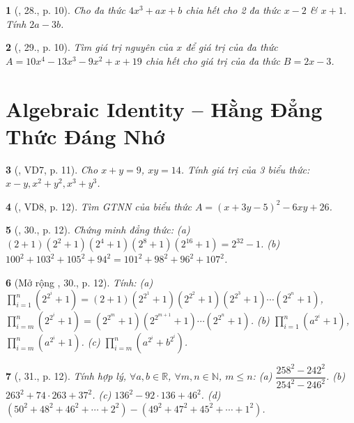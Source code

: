 \documentclass{article}
\newtheorem{baitoan}{}
\begin{document}
\begin{baitoan}[\cite{Tuyen_Toan_8}, 28., p. 10]
	Cho đa thức $4x^3 + ax + b$ chia hết cho 2 đa thức $x - 2$ \& $x + 1$. Tính $2a - 3b$.
\end{baitoan}

\begin{baitoan}[\cite{Tuyen_Toan_8}, 29., p. 10]
	Tìm giá trị nguyên của $x$ để giá trị của đa thức $A = 10x^4 - 13x^3 - 9x^2 + x + 19$ chia hết cho giá trị của đa thức $B = 2x - 3$.
\end{baitoan}


\section{Algebraic Identity -- Hằng Đẳng Thức Đáng Nhớ}

\begin{baitoan}[\cite{Tuyen_Toan_8}, VD7, p. 11]
	Cho $x + y = 9$, $xy = 14$. Tính giá trị của 3 biểu thức: $x - y,x^2 + y^2,x^3 + y^3$.
\end{baitoan}

\begin{baitoan}[\cite{Tuyen_Toan_8}, VD8, p. 12]
	Tìm {\rm GTNN} của biểu thức $A = (x + 3y - 5)^2 - 6xy + 26$.
\end{baitoan}

\begin{baitoan}[\cite{Tuyen_Toan_8}, 30., p. 12]
	Chứng minh đẳng thức: (a) $(2 + 1)(2^2 + 1)(2^4 + 1)(2^8 + 1)(2^{16} + 1) = 2^{32} - 1$. (b) $100^2 + 103^2 + 105^2 + 94^2 = 101^2 + 98^2 + 96^2 + 107^2$.
\end{baitoan}

\begin{baitoan}[Mở rộng \cite{Tuyen_Toan_8}, 30., p. 12]
	Tính: (a) $\prod_{i=1}^n (2^{2^i} + 1) = (2 + 1)(2^{2^1} + 1)(2^{2^2} + 1)(2^{2^3} + 1)\cdots(2^{2^n} + 1)$, $\prod_{i=m}^n (2^{2^i} + 1) = (2^{2^m} + 1)(2^{2^{m+1}} + 1)\cdots(2^{2^n} + 1)$. (b) $\prod_{i=1}^n (a^{2^i} + 1)$, $\prod_{i=m}^n (a^{2^i} + 1)$. (c) $\prod_{i=m}^n (a^{2^i} + b^{2^i})$.
\end{baitoan}

\begin{baitoan}[\cite{Tuyen_Toan_8}, 31., p. 12]
	Tính hợp lý, $\forall a,b\in\mathbb{R}$, $\forall m,n\in\mathbb{N}$, $m\le n$: (a) $\dfrac{258^2 - 242^2}{254^2 - 246^2}$. (b) $263^2 + 74\cdot263 + 37^2$. (c) $136^2 - 92\cdot136 + 46^2$. (d) $(50^2 + 48^2 + 46^2 + \cdots + 2^2) - (49^2 + 47^2 + 45^2 + \cdots + 1^2)$.
\end{baitoan}
\end{document}
